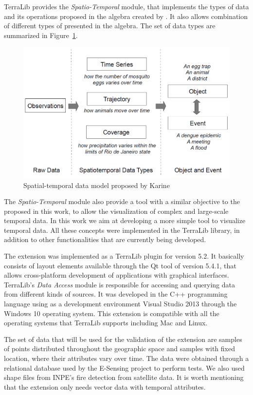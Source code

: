 \documentclass[12pt]{article}
\begin{document}
TerraLib provides the \textit{Spatio-Temporal} module, that implements the types of data and its operations proposed  in the algebra created by \cite{karine:14}. It also allows combination of  different types of  presented in the algebra. The set of data types are summarized in Figure~\ref{fig:exampleKarine}.

\begin{figure}[ht]
\centering
\includegraphics[width=.6\textwidth]{karine-model.png}
\caption{Spatial-temporal data model proposed by Karine}
\label{fig:exampleKarine}
\end{figure}

The \textit{Spatio-Temporal} module also provide a tool with a similar objective to the proposed in this work, to allow the visualization of  complex and large-scale temporal data. In this work we aim at developing a more simple tool to visualize temporal data. All these concepts were implemented in the TerraLib library, in addition to other functionalities that are currently being developed.


The extension was implemented as a TerraLib plugin for version 5.2. It basically consists of layout elements available through the Qt \cite{qt} tool of version 5.4.1, that allows cross-platform development of applications with graphical interfaces. TerraLib's \textit{Data Access} module is responsible for accessing and querying data from different
kinds of sources. It was developed in the C++ programming language using as a development environment Visual Studio 2013 through the Windows 10 operating system. This extension is compatible with all the operating systems that TerraLib supports including Mac and Linux.

The set of data that will be used for the validation of the extension are samples of points distributed throughout the geographic space and samples with fixed location, where their attributes vary over time. The data were obtained through a relational database used by the E-Sensing \cite{esensing} project to perform tests. We also used  shape files  from INPE's fire  detection from satellite data. It is worth mentioning that the extension only needs vector data with temporal attributes.
\end{document}
